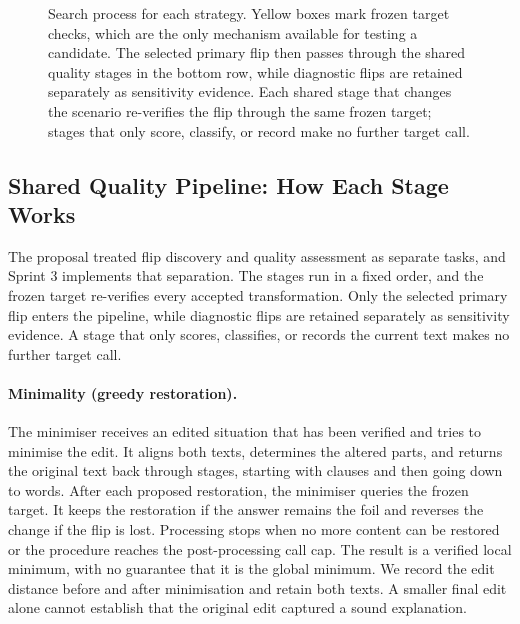 \documentclass[11pt,a4paper]{article}
\begin{document}
\begin{figure}[htbp]
\caption{Search process for each strategy. Yellow boxes mark frozen target checks,
which are the only mechanism available for testing a candidate. The selected primary
flip then passes through the shared quality stages in the bottom row, while
diagnostic flips are retained separately as sensitivity evidence. Each shared stage
that changes the scenario re-verifies the flip through the same frozen target;
stages that only score, classify, or record make no further target call.}
\label{fig:flows}
\end{figure}

\subsection{Shared Quality Pipeline: How Each Stage Works}
\label{sec:quality}

The proposal treated flip discovery and quality assessment as separate tasks, and
Sprint 3 implements that separation. The stages run in a fixed order, and the frozen
target re-verifies every accepted transformation. Only the selected primary flip
enters the pipeline, while diagnostic flips are retained separately as sensitivity
evidence. A stage that only scores, classifies, or records the current text makes no
further target call.

\paragraph{Minimality (greedy restoration).}
The minimiser receives an edited situation that has been verified and tries to minimise
the edit. It aligns both texts, determines the altered parts, and returns the
original text back through stages, starting with clauses and then going down to words. After each proposed
restoration, the minimiser queries the frozen target. It keeps the restoration if the
answer remains the foil and reverses the change if the flip is lost. Processing stops
when no more content can be restored or the procedure reaches the post-processing
call cap. The result is a verified local minimum, with no guarantee that it is the
global minimum. We record the edit distance before and after minimisation and retain
both texts. A smaller final edit alone cannot establish that the original edit
captured a sound explanation.
\end{document}
